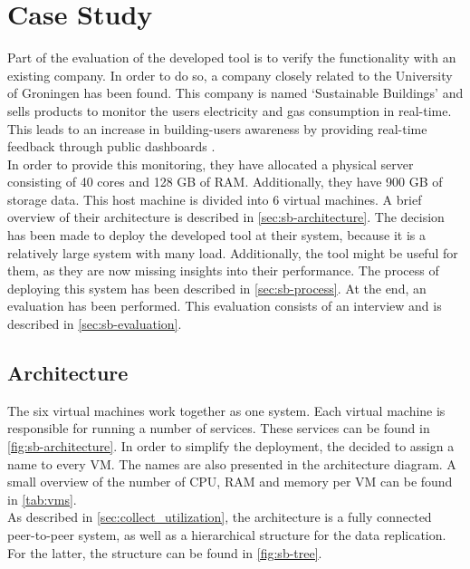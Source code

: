 \chapter{Case Study}\label{ch:evaluation}
Part of the evaluation of the developed tool is to verify the functionality with an existing company. In order to do so, a company closely related to the University of Groningen has been found. This company is named `Sustainable Buildings' and sells products to monitor the users electricity and gas consumption in real-time. This leads to an increase in building-users awareness by providing real-time feedback through public dashboards \cite{sb}.\\

\noindent
In order to provide this monitoring, they have allocated a physical server consisting of 40 cores and 128 GB of RAM. Additionally, they have 900 GB of storage data. This host machine is divided into 6 virtual machines. A brief overview of their architecture is described in \autoref{sec:sb-architecture}. The decision has been made to deploy the developed tool at their system, because it is a relatively large system with many load. Additionally, the tool might be useful for them, as they are now missing insights into their performance. The process of deploying this system has been described in \autoref{sec:sb-process}. At the end, an evaluation has been performed. This evaluation consists of an interview and is described in \autoref{sec:sb-evaluation}.

\section{Architecture} \label{sec:sb-architecture}
The six virtual machines work together as one system. Each virtual machine is responsible for running a number of services. These services can be found in \autoref{fig:sb-architecture}. In order to simplify the deployment, the decided to assign a name to every VM. The names are also presented in the architecture diagram. A small overview of the number of CPU, RAM and memory per VM can be found in \autoref{tab:vms}.\\

As described in \autoref{sec:collect_utilization}, the architecture is a fully connected peer-to-peer system, as well as a hierarchical structure for the data replication. For the latter, the structure can be found in \autoref{fig:sb-tree}.


